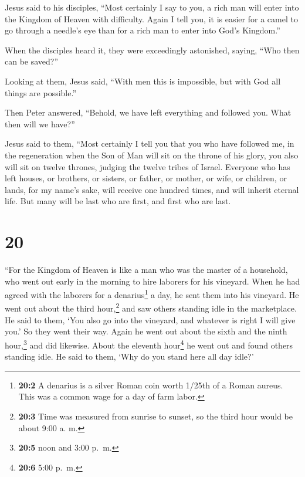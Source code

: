  Jesus said to his disciples, ``Most certainly I say to
you, a rich man will enter into the Kingdom of Heaven with difficulty.
 Again I tell you, it is easier for a camel to go through
a needle's eye than for a rich man to enter into God's Kingdom.''

 When the disciples heard it, they were exceedingly
astonished, saying, ``Who then can be saved?''

 Looking at them, Jesus said, ``With men this is
impossible, but with God all things are possible.''

 Then Peter answered, ``Behold, we have left everything
and followed you. What then will we have?''

 Jesus said to them, ``Most certainly I tell you that you
who have followed me, in the regeneration when the Son of Man will sit
on the throne of his glory, you also will sit on twelve thrones, judging
the twelve tribes of Israel.  Everyone who has left
houses, or brothers, or sisters, or father, or mother, or wife, or
children, or lands, for my name's sake, will receive one hundred times,
and will inherit eternal life.  But many will be last who
are first, and first who are last.

\hypertarget{section-19}{%
\section{20}\label{section-19}}

 ``For the Kingdom of Heaven is like a man who was the
master of a household, who went out early in the morning to hire
laborers for his vineyard.  When he had agreed with the
laborers for a denarius\footnote{\textbf{20:2} A denarius is a silver
  Roman coin worth 1/25th of a Roman aureus. This was a common wage for
  a day of farm labor.} a day, he sent them into his vineyard.
 He went out about the third hour,\footnote{\textbf{20:3}
  Time was measured from sunrise to sunset, so the third hour would be
  about 9:00 a. m.} and saw others standing idle in the marketplace.
 He said to them, `You also go into the vineyard, and
whatever is right I will give you.' So they went their way.
 Again he went out about the sixth and the ninth
hour,\footnote{\textbf{20:5} noon and 3:00 p.~m.} and did likewise.
 About the eleventh hour\footnote{\textbf{20:6} 5:00 p.~m.}
he went out and found others standing idle. He said to them, `Why do you
stand here all day idle?'

